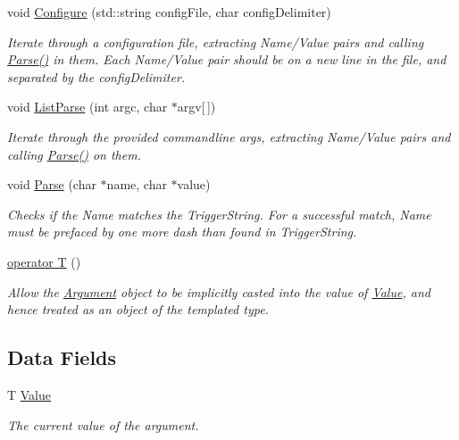 \begin{DoxyCompactItemize}
void \hyperlink{classJSL_1_1Argument_aa626ff37dbebaf0501614dc625a76383}{Configure} (std\+::string config\+File, char config\+Delimiter)
\begin{DoxyCompactList}\small\item\em Iterate through a configuration file, extracting Name/\+Value pairs and calling \hyperlink{classJSL_1_1Argument_a8984e7ce23155259d90a3e98170f36e0}{Parse()} in them. Each Name/\+Value pair should be on a new line in the file, and separated by the {\itshape config\+Delimiter}. \end{DoxyCompactList}\item 
void \hyperlink{classJSL_1_1Argument_aa2b18bb35e90f91e224a06d60835053a}{List\+Parse} (int argc, char $\ast$argv\mbox{[}$\,$\mbox{]})
\begin{DoxyCompactList}\small\item\em Iterate through the provided commandline args, extracting Name/\+Value pairs and calling \hyperlink{classJSL_1_1Argument_a8984e7ce23155259d90a3e98170f36e0}{Parse()} on them. \end{DoxyCompactList}\item 
void \hyperlink{classJSL_1_1Argument_a8984e7ce23155259d90a3e98170f36e0}{Parse} (char $\ast$name, char $\ast$value)
\begin{DoxyCompactList}\small\item\em Checks if the Name matches the Trigger\+String. For a successful match, Name must be prefaced by one more dash than found in Trigger\+String. \end{DoxyCompactList}\item 
\hyperlink{classJSL_1_1Argument_a965bc0dfdce6e03380605af313f8c880}{operator T} ()
\begin{DoxyCompactList}\small\item\em Allow the \hyperlink{classJSL_1_1Argument}{Argument} object to be implicitly casted into the value of \hyperlink{classJSL_1_1Argument_a83ada5bfa412192f76dd4290f679defd}{Value}, and hence treated as an object of the templated type. \end{DoxyCompactList}\end{DoxyCompactItemize}
\subsection*{Data Fields}
\begin{DoxyCompactItemize}
\item 
T \hyperlink{classJSL_1_1Argument_a83ada5bfa412192f76dd4290f679defd}{Value}
\begin{DoxyCompactList}\small\item\em The current value of the argument. \end{DoxyCompactList}\end{DoxyCompactItemize}
